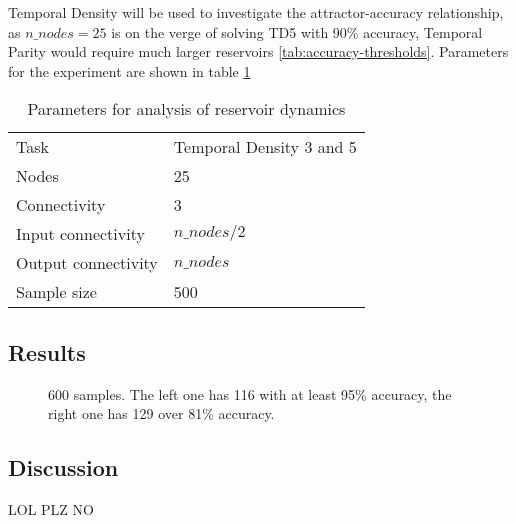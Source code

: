 Temporal Density will be used to investigate the attractor-accuracy relationship,
as $ n\_nodes = 25 $ is on the verge of solving TD5 with 90\% accuracy,
Temporal Parity would require much larger reservoirs \ref{tab:accuracy-thresholds}.
Parameters for the experiment are shown in table \ref{tab:reservoir-dynamics-parameters}

\begin{table}[ht]
    \centering
    \caption{Parameters for analysis of reservoir dynamics}
    \label{tab:reservoir-dynamics-parameters}
    \begin{tabular}{ll}
        Task                & Temporal Density 3 and 5  \\
        Nodes               & 25                        \\
        Connectivity        & 3                         \\
        Input connectivity  & $ n\_nodes / 2 $          \\
        Output connectivity & $ n\_nodes $              \\
        Sample size         & 500
    \end{tabular}
\end{table}

%
%

\subsection{Results}

\begin{figure*}
    \centering
    \caption{
        600 samples. The left one has 116 with at least 95\% accuracy,
        the right one has 129 over 81\% accuracy.
    }
\end{figure*}

\subsection{Discussion}

LOL PLZ NO
